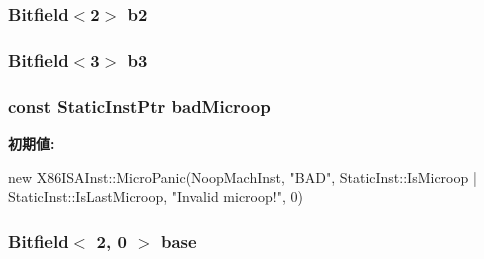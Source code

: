 \label{namespaceX86ISA_a66555249fda949dad20c4b90ea4fb029}
\hypertarget{namespaceX86ISA_a69d3dc3105a3855e17424d45818c6935}{
\subsubsection[{b2}]{\setlength{\rightskip}{0pt plus 5cm}Bitfield$<$2$>$ {\bf b2}}}
\label{namespaceX86ISA_a69d3dc3105a3855e17424d45818c6935}
\hypertarget{namespaceX86ISA_a8db94203bb67d6451e75b711c0f519ec}{
\subsubsection[{b3}]{\setlength{\rightskip}{0pt plus 5cm}Bitfield$<$3$>$ {\bf b3}}}
\label{namespaceX86ISA_a8db94203bb67d6451e75b711c0f519ec}
\hypertarget{namespaceX86ISA_ad81a1662d6261445c39468b0e178289c}{
\subsubsection[{badMicroop}]{\setlength{\rightskip}{0pt plus 5cm}const {\bf StaticInstPtr} {\bf badMicroop}}}
\label{namespaceX86ISA_ad81a1662d6261445c39468b0e178289c}
{\bfseries 初期値:}
\begin{DoxyCode}

    new X86ISAInst::MicroPanic(NoopMachInst, "BAD",
        StaticInst::IsMicroop | StaticInst::IsLastMicroop,
        "Invalid microop!", 0)
\end{DoxyCode}
\hypertarget{namespaceX86ISA_a22fd87812cbb48f6d80b6cc7957490cf}{
\subsubsection[{base}]{\setlength{\rightskip}{0pt plus 5cm}Bitfield$<$ 2, 0 $>$ {\bf base}}}
\label{namespaceX86ISA_a22fd87812cbb48f6d80b6cc7957490cf}
\hypertarget{namespaceX86ISA_a5e3e543cae98291127a676c292cb9a05}{
\subsubsection[{baseHigh}]{}}
\label{namespaceX86ISA_a5e3e543cae98291127a676c292cb9a05}
